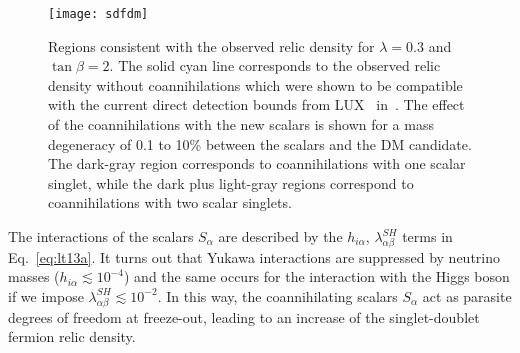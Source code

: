 \begin{figure}
  \centering
  \texttt{[image: sdfdm]}
  \caption{Regions consistent with the observed relic density for $\lambda=0.3$
   and $\tan\beta=2$.    The solid cyan line corresponds to the observed relic density
   without coannihilations which were shown to be compatible with the
   current direct detection bounds from LUX~\cite{Akerib:2013tjd}
   in~\cite{Cheung:2013dua}.
   The effect of the coannihilations with the new scalars is shown for
   a mass degeneracy of 0.1 to 10\% between the scalars and the DM
   candidate. 
   The dark-gray region corresponds to coannihilations with one scalar
   singlet, while the dark plus light-gray regions correspond to
   coannihilations with two scalar singlets.  }
  \label{fig:5b}
\end{figure}


The interactions of the scalars $S_\alpha$ are described by the
$h_{i\alpha}$, $\lambda_{\alpha\beta}^{SH}$ terms in
Eq.~\eqref{eq:lt13a}. 
It turns out that Yukawa interactions are suppressed by neutrino
masses ($h_{i\alpha}\lesssim10^{-4}$) and the same occurs for the interaction
with the Higgs boson if we impose
$\lambda_{\alpha\beta}^{SH}\lesssim10^{-2}$.
In this way, the coannihilating scalars $S_\alpha$ act as parasite
degrees of freedom at freeze-out, leading to an increase of the
singlet-doublet fermion relic density. 

